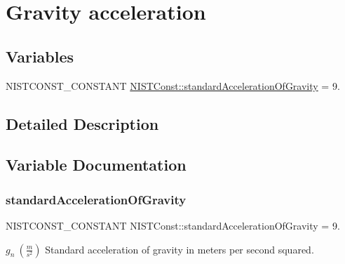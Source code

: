 \hypertarget{group___n_i_s_t_const-_gravity_acceleration}{}\section{Gravity acceleration}
\label{group___n_i_s_t_const-_gravity_acceleration}
\subsection*{Variables}
\begin{DoxyCompactItemize}
\item 
N\+I\+S\+T\+C\+O\+N\+S\+T\+\_\+\+C\+O\+N\+S\+T\+A\+NT \mbox{\hyperlink{group___n_i_s_t_const-_gravity_acceleration_ga22b6c6320ba235b01a0c0a1b3f9fd043}{N\+I\+S\+T\+Const\+::standard\+Acceleration\+Of\+Gravity}} = 9.
\end{DoxyCompactItemize}


\subsection{Detailed Description}


\subsection{Variable Documentation}
\mbox{\label{group___n_i_s_t_const-_gravity_acceleration_ga22b6c6320ba235b01a0c0a1b3f9fd043}} 
\subsubsection{\texorpdfstring{standard\+Acceleration\+Of\+Gravity}{standardAccelerationOfGravity}}
{\footnotesize\ttfamily N\+I\+S\+T\+C\+O\+N\+S\+T\+\_\+\+C\+O\+N\+S\+T\+A\+NT N\+I\+S\+T\+Const\+::standard\+Acceleration\+Of\+Gravity = 9.}

$g_n \ (\frac{m}{s^2})$ Standard acceleration of gravity in meters per second squared. 